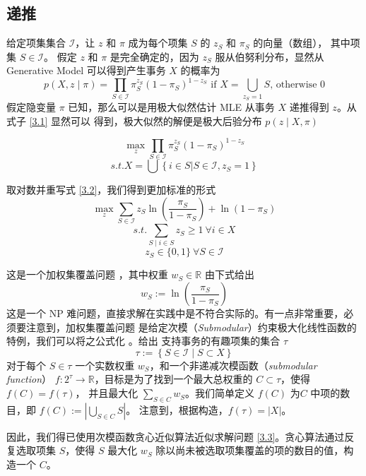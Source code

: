 \documentclass{ctexart}
\newcommand{\scri}[0]{\mathcal{I}}
\begin{document}
\subsection{递推}

给定项集集合 $\scri$，让 $z$ 和 $\pi$ 成为每个项集 $S$ 的 $z_S$ 和 $\pi_S$ 的向量（数组），
其中项集 $S \in \scri$。
假定 $z$ 和 $\pi$ 是完全确定的，因为 $z_S$ 服从伯努利分布，显然从 Generative Model 可以得到产生事务 $X$ 的概率为
\begin{equation}
\label{3.1}
p(X, z \mid \pi) = \prod_{S \in \scri} \pi_S^{z_S} (1 - \pi_S)^{1 - z_S}
\text{ if } X = \bigcup_{z_S = 1} S \text{, otherwise } 0
\end{equation}
假定隐变量  $\pi$ 已知，那么可以是用极大似然估计 MLE 从事务 $X$ 递推得到 $z$。从式子 \ref{3.1} 显然可以
得到，极大似然的解便是极大后验分布 $p(z \mid X, \pi)$

\begin{equation}
\label{3.2}
\max_z \prod_{S \in \scri} \pi_S^{z_S} (1 - \pi_S)^{1 - z_S}
\end{equation}
$$
s.t. X = \bigcup \left\{ i \in S | S \in \scri, z_S = 1 \right\}
$$

取对数并重写式 \ref{3.2}，我们得到更加标准的形式
\begin{equation}
\label{3.3}
\max_z \sum_{S \in \scri} z_S \ln \left( \frac{\pi_S}{1 - \pi_S} \right) + \ln \left(1 - \pi_S \right)
\end{equation}
$$
s.t. \sum_{S \mid i \in S} z_S \geq 1 \ \forall i \in X
$$
$$
z_S \in \{0, 1\} \ \forall S \in \scri
$$

这是一个加权集覆盖问题 \cite{weighted-set-cover}，其中权重 $w_S \in \mathbb{R} $ 由下式给出
$$
w_S := \ln\left( \frac{\pi_S}{1 - \pi_S} \right)
$$
这是一个 NP 难问题，直接求解在实践中是不符合实际的。有一点非常重要，必须要注意到，加权集覆盖问题
是给定次模（\textit{Submodular}）约束极大化线性函数的特例，我们可以将之公式化 \cite{young}。给出
支持事务的有趣项集的集合 $\tau$
\begin{equation}
\label{3.4}
\tau := \left\{ S \in \scri \mid S \subset X \right\}
\end{equation}
对于每个 $S \in \tau$ 一个实数权重 $w_S$，和一个非递减次模函数（\textit{submodular function}）
$f: 2^\tau \to \mathbb{R}$，目标是为了找到一个最大总权重的 $C \subset \tau$，使得 $f(C) = f(\tau)$，
并且最大化 $\sum_{S \in C} w_S$。我们简单定义 $f(C)$ 为$C$ 中项的数目，即 $f(C) := | \bigcup_{S \in C} S |$。
注意到，根据构造，$f(\tau) = | X | $。

因此，我们得已使用次模函数贪心近似算法近似求解问题 \ref{3.3}。贪心算法通过反复选取项集 $S$，使得
$S$ 最大化 $w_S$ 除以尚未被选取项集覆盖的项的数目的值，构造一个 $C$。
\end{document}

